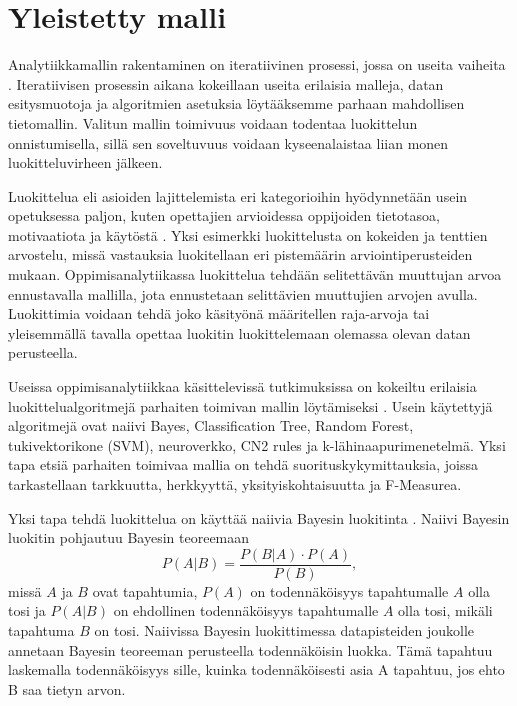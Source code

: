 \section{Yleistetty malli}

Analytiikkamallin rakentaminen on iteratiivinen prosessi, jossa on useita vaiheita \citep{hamalainenClassifiersEducationalData2010}. Iteratiivisen prosessin aikana kokeillaan useita erilaisia malleja, datan esitysmuotoja ja algoritmien asetuksia löytääksemme parhaan mahdollisen tietomallin. Valitun mallin toimivuus voidaan todentaa luokittelun onnistumisella, sillä sen soveltuvuus voidaan kyseenalaistaa liian monen luokitteluvirheen jälkeen.

Luokittelua eli asioiden lajittelemista eri kategorioihin hyödynnetään usein opetuksessa paljon, kuten opettajien arvioidessa oppijoiden tietotasoa, motivaatiota ja käytöstä \citep{hamalainenClassifiersEducationalData2010}. Yksi esimerkki luokittelusta on kokeiden ja tenttien arvostelu, missä vastauksia luokitellaan eri pistemäärin arviointiperusteiden mukaan. Oppimisanalytiikassa luokittelua tehdään selitettävän muuttujan arvoa ennustavalla mallilla, jota ennustetaan selittävien muuttujien arvojen avulla. Luokittimia voidaan tehdä joko käsityönä määritellen raja-arvoja tai yleisemmällä tavalla opettaa luokitin luokittelemaan olemassa olevan datan perusteella.

Useissa oppimisanalytiikkaa käsittelevissä tutkimuksissa on kokeiltu erilaisia luokittelualgoritmejä parhaiten toimivan mallin löytämiseksi \citep{akcapinarUsingLearningAnalytics2019}. Usein käytettyjä algoritmejä ovat naiivi Bayes, Classification Tree, Random Forest, tukivektorikone (SVM), neuroverkko, CN2 rules ja k-lähinaapurimenetelmä. Yksi tapa etsiä parhaiten toimivaa mallia on tehdä suorituskykymittauksia, joissa tarkastellaan tarkkuutta, herkkyyttä, yksityiskohtaisuutta ja F-Measurea.

Yksi tapa tehdä luokittelua on käyttää naiivia Bayesin luokitinta \citep{natinggaDataScienceAlgorithms2018}. Naiivi Bayesin luokitin pohjautuu Bayesin teoreemaan $$P(A | B) = \frac{P(B | A) \cdot P(A)}{P(B)},$$ missä $A$ ja $B$ ovat tapahtumia, $P(A)$ on todennäköisyys tapahtumalle $A$ olla tosi ja $P(A | B)$ on ehdollinen todennäköisyys tapahtumalle $A$ olla tosi, mikäli tapahtuma $B$ on tosi. Naiivissa Bayesin luokittimessa datapisteiden joukolle annetaan Bayesin teoreeman perusteella todennäköisin luokka. Tämä tapahtuu laskemalla todennäköisyys sille, kuinka todennäköisesti asia A tapahtuu, jos ehto B saa tietyn arvon.


